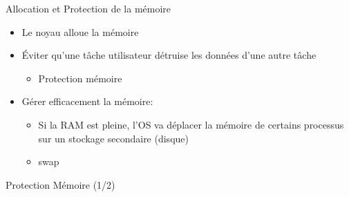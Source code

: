 \documentclass[11pt]{beamer}
\begin{document}
\begin{frame}{Allocation et Protection de la mémoire}

\begin{itemize}
\itemsep1pt\parskip0pt
\item
  Le noyau alloue la mémoire
\item
  Éviter qu'une tâche utilisateur détruise les données d'une autre tâche

  \begin{itemize}
  \itemsep1pt\parskip0pt
  \item
    Protection mémoire
  \end{itemize}
\item
  Gérer efficacement la mémoire:

  \begin{itemize}
  \itemsep1pt\parskip0pt
  \item
    Si la RAM est pleine, l'OS va déplacer la mémoire de certains
    processus sur un stockage secondaire (disque)
  \item
    swap
  \end{itemize}
\end{itemize}

\end{frame}


\begin{slide}{Protection Mémoire (1/2)}
\end{slide}
\end{document}
